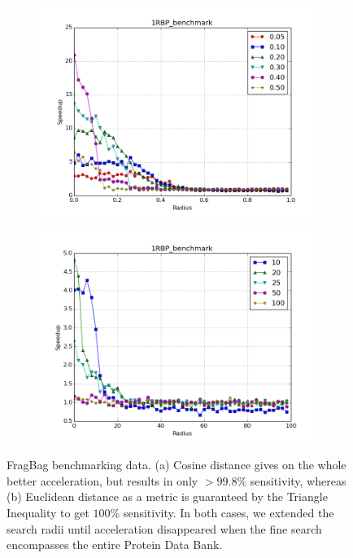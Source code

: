 \documentclass[review,preprint,12pt]{elsarticle}
\theoremstyle{definition}
\theoremstyle{remark}
\numberwithin{equation}{section}
\begin{document}
\begin{figure}[tbp]
\begin{subfigure}[b]{0.40\textwidth}
        \includegraphics[width=1\textwidth]{assets/1RBP_benchmark_cosine}
    \end{subfigure}%
    \begin{subfigure}[b]{0.40\textwidth}
        \includegraphics[width=1\textwidth]{assets/1RBP_benchmark_euclid}
    \end{subfigure}
    \caption{FragBag benchmarking data. (a) Cosine distance gives on the whole better acceleration, but results in only $>99.8\%$ sensitivity, whereas (b) Euclidean distance as a metric is guaranteed by the Triangle Inequality to get $100\%$ sensitivity. In both cases, we extended the search radii until acceleration disappeared when the fine search encompasses the entire Protein Data Bank. }
    \label{fig:fragbag}
\end{figure}
\end{document}
